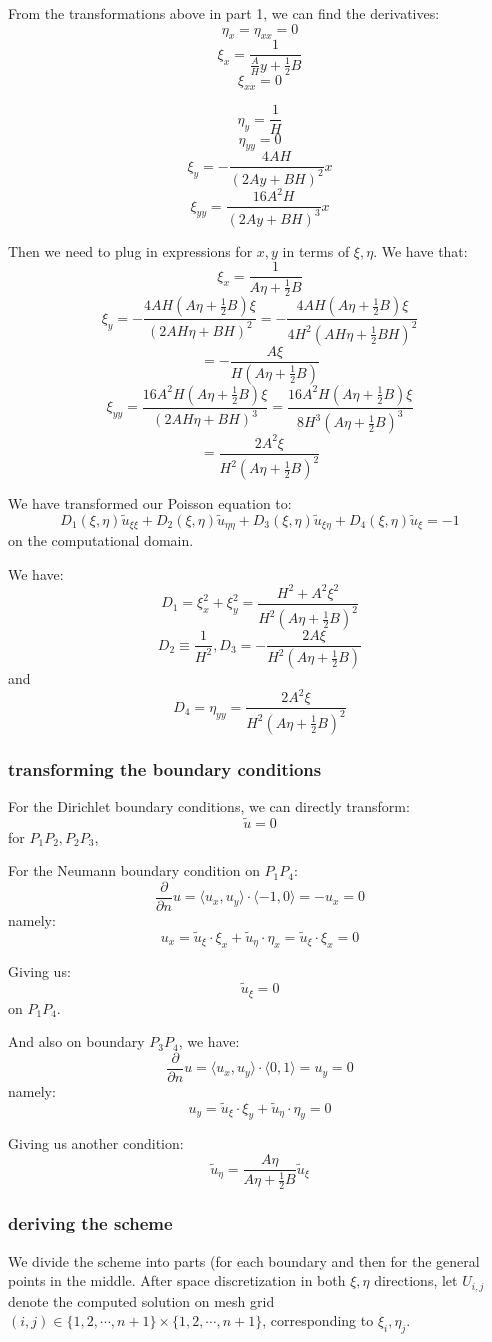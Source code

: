 \documentclass[12pt]{article}
\newcommand{\pdx}[1]{\frac{\partial}{\partial {#1}}}
\newcommand{\iprod}[1]{\langle {#1}\rangle}
\begin{document}
From the transformations above in part 1, we can find the derivatives:
$$
	\eta_{x} = \eta_{xx} = 0
$$
$$
	\xi_{x} = \frac{1}{\frac{A}{H}y + \frac{1}{2}B}
$$
$$
	\xi_{xx} = 0
$$
 
$$
	\eta_{y} = \frac1H
$$
$$
	\eta_{yy} = 0
$$
$$
	\xi_{y} = -\frac{4AH}{(2Ay+BH)^2}x
$$
$$
	\xi_{yy} = \frac{16A^2H}{(2Ay+BH)^3}x
$$

Then we need to plug in expressions for $x,y$ in terms of $\xi,\eta$. We have that:
$$
	\xi_{x} = \frac{1}{A\eta+\frac{1}{2}B}
$$
$$
	\xi_{y} = -\frac{4AH(A\eta+\frac{1}{2}B)\xi}{(2AH\eta+BH)^2} = -\frac{4AH(A\eta+\frac{1}{2}B)\xi}{4H^2(AH\eta+\frac12 BH)^2}
$$
$$
	= -\frac{A\xi}{H(A\eta+\frac12 B)}
$$
$$
	\xi_{yy} = \frac{16A^2 H(A\eta+\frac{1}{2}B)\xi}{(2AH\eta+BH)^3} = \frac{16A^2 H(A\eta+\frac{1}{2}B)\xi}{8H^3(A\eta+\frac12 B)^3}
$$
$$
	= \frac{2A^2\xi}{H^2(A\eta+\frac{1}{2}B)^2}
$$


We have transformed our Poisson equation to:
$$
	D_1(\xi,\eta)\tilde{u}_{\xi\xi} + D_2(\xi,\eta)\tilde{u}_{\eta\eta} + D_3(\xi,\eta)\tilde{u}_{\xi\eta}+D_4(\xi,\eta)\tilde{u}_{\xi} = -1
$$ on the computational domain.

We have:
$$
	D_1 = \xi_{x}^2 + \xi_{y}^2 = \frac{H^2+A^2\xi^2}{H^2(A\eta + \frac12 B)^2}
$$
$$
	D_2 \equiv \frac{1}{H^2}, D_3 = -\frac{2A\xi}{H^2(A\eta + \frac12 B)}
$$ and
$$
	D_4 = \eta_{yy} = \frac{2A^2\xi}{H^2(A\eta+\frac{1}{2}B)^2}
$$


\subsubsection{transforming the boundary conditions}
For the Dirichlet boundary conditions, we can directly transform:
$$
	\tilde{u} = 0
$$ for $P_1P_2, P_2P_3$,

For the Neumann boundary condition on $P_1P_4$:
$$
	\pdx{n}u = \iprod{u_x,u_y} \cdot \iprod{-1,0} = -u_x = 0
$$ namely:
$$
	u_x = \tilde{u}_{\xi} \cdot \xi_{x} + \tilde{u}_{\eta} \cdot \eta_{x} = \tilde{u}_{\xi}\cdot \xi_{x} = 0
$$

Giving us:
$$
	\tilde{u}_{\xi} = 0
$$ on $P_1P_4$.


And also on boundary $P_3P_4$, we have:
$$
	\pdx{n}u = \iprod{u_x,u_y} \cdot \iprod{0,1} = u_y = 0
$$ namely:
$$
	u_y = \tilde{u}_{\xi}\cdot \xi_{y} + \tilde{u}_{\eta}\cdot \eta_{y} = 0
$$

Giving us another condition:
$$
	\tilde{u}_{\eta} = \frac{A\eta}{A\eta+\frac{1}{2}B}\tilde{u}_{\xi}
$$
\subsubsection{deriving the scheme}
We divide the scheme into parts (for each boundary and then for the general points in the middle. After space discretization in both $\xi,\eta$ directions, let $U_{i,j}$ denote the computed solution on mesh grid $(i,j) \in \{ 1,2,\cdots,n+1\} \times \{ 1,2,\cdots,n+1\}$, corresponding to $\xi_i, \eta_j$. 
\end{document}
